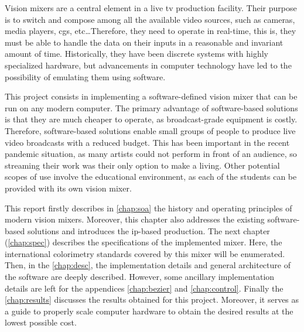 \documentclass[../main.tex]{subfiles}
\begin{document}
\label{chap:intro}

Vision mixers are a central element in a live \gls{tv} production facility. Their purpose is to switch and compose among all the available video sources, such as cameras, media players, \glspl{cg}, etc\dots Therefore, they need to operate in real-time, this is, they must be able to handle the data on their inputs in a reasonable and invariant amount of time. Historically, they have been discrete systems with highly specialized hardware, but advancements in computer technology have led to the possibility of emulating them using software.\newline

This project consists in implementing a software-defined vision mixer that can be run on any modern computer. The primary advantage of software-based solutions is that they are much cheaper to operate, as broadcast-grade equipment is costly. Therefore, software-based solutions enable small groups of people to produce live video broadcasts with a reduced budget. This has been important in the recent pandemic situation, as many artists could not perform in front of an audience, so streaming their work was their only option to make a living. Other potential scopes of use involve the educational environment, as each of the students can be provided with its own vision mixer. \newline

This report firstly describes in \autoref{chap:soa} the history and operating principles of modern vision mixers. Moreover, this chapter also addresses the existing software-based solutions and introduces the \gls{ip}-based production. The next chapter (\autoref{chap:spec}) describes the specifications of the implemented mixer. Here, the international colorimetry standards covered by this mixer will be enumerated. Then, in the \autoref{chap:desc}, the implementation details and general architecture of the software are deeply described. However, some ancillary implementation details are left for the appendices \ref{chap:bezier} and \ref{chap:control}. Finally the \autoref{chap:results} discusses the results obtained for this project. Moreover, it serves as a guide to properly scale computer hardware to obtain the desired results at the lowest possible cost.\newline



\end{document}

